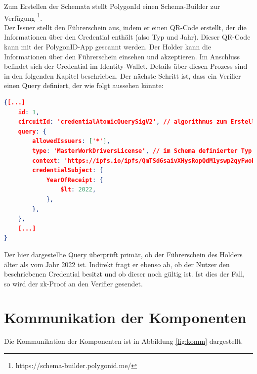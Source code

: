 Zum Erstellen der Schemata stellt PolygonId einen Schema-Builder zur Verfügung \footnote{https://schema-builder.polygonid.me/}. \\
Der Issuer stellt den Führerschein aus, indem er einen QR-Code erstellt, der die Informationen über den Credential enthält (also Typ und Jahr). Dieser QR-Code kann mit der PolygonID-App gescannt werden. Der Holder kann die Informationen über den Führerschein einsehen und akzeptieren. Im Anschluss befindet sich der Credential im Identity-Wallet. Details über diesen Prozess sind in den folgenden Kapitel beschrieben. Der nächste Schritt ist, dass ein Verifier einen Query definiert, der wie folgt aussehen könnte:
\begin{lstlisting}[language=json,firstnumber=1]
{[...]
	id: 1,
	circuitId: 'credentialAtomicQuerySigV2', // algorithmus zum Erstellen des zk-Proofs
	query: {
		allowedIssuers: ['*'],
		type: 'MasterWorkDriversLicense', // im Schema definierter Typ
		context: 'https://ipfs.io/ipfs/QmTSd6saivXHysRopQdM1yswp2qyFwobL7fwuFpkVTS8gd',
		credentialSubject: {
			YearOfReceipt: {
				$lt: 2022,
			},
		},
	},
	[...]
}
\end{lstlisting}
Der hier dargestellte Query überprüft primär, ob der Führerschein des Holders älter als vom Jahr 2022 ist. Indirekt fragt er ebenso ab, ob der Nutzer den beschriebenen Credential besitzt und ob dieser noch gültig ist. Ist dies der Fall, so wird der zk-Proof an den Verifier gesendet.
\newpage
\section{Kommunikation der Komponenten}
Die Kommunikation der Komponenten ist in Abbildung \ref{fig:komm} dargestellt.

